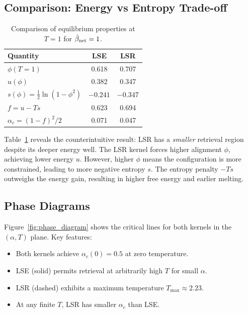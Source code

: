 \documentclass{article}
\theoremstyle{plain}
\theoremstyle{definition}
\theoremstyle{remark}
\begin{document}
\subsection{Comparison: Energy vs Entropy Trade-off}

\begin{table}[t]
\caption{Comparison of equilibrium properties at $T = 1$ for $\hat{\beta}_{\rm net} = 1$.}
\label{tab:comparison}
\vskip 0.1in
\begin{center}
\begin{small}
\begin{tabular}{lcc}
\toprule
Quantity & LSE & LSR \\
\midrule
$\phi(T=1)$ & 0.618 & 0.707 \\
$u(\phi)$ & 0.382 & 0.347 \\
$s(\phi) = \frac{1}{2}\ln(1-\phi^2)$ & $-0.241$ & $-0.347$ \\
$f = u - Ts$ & 0.623 & 0.694 \\
$\alpha_c = (1-f)^2/2$ & 0.071 & 0.047 \\
\bottomrule
\end{tabular}
\end{small}
\end{center}
\end{table}

Table~\ref{tab:comparison} reveals the counterintuitive result: LSR has a \emph{smaller} retrieval region despite its deeper energy well. The LSR kernel forces higher alignment $\phi$, achieving lower energy $u$. However, higher $\phi$ means the configuration is more constrained, leading to more negative entropy $s$. The entropy penalty $-Ts$ outweighs the energy gain, resulting in higher free energy and earlier melting.

\subsection{Phase Diagrams}

Figure~\ref{fig:phase_diagram} shows the critical lines for both kernels in the $(\alpha, T)$ plane. Key features:
\begin{itemize}
    \item Both kernels achieve $\alpha_c(0) = 0.5$ at zero temperature.
    \item LSE (solid) permits retrieval at arbitrarily high $T$ for small $\alpha$.
    \item LSR (dashed) exhibits a maximum temperature $T_{\max} \approx 2.23$.
    \item At any finite $T$, LSR has smaller $\alpha_c$ than LSE.
\end{itemize}
\end{document}
